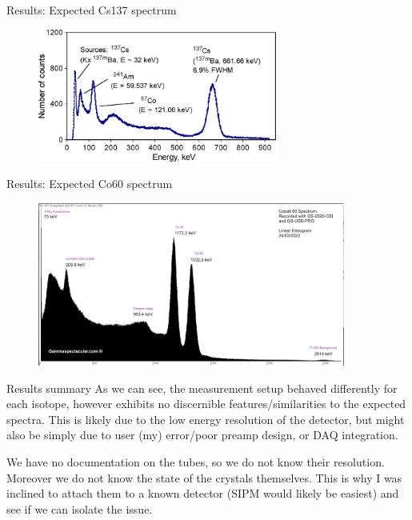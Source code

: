 \begin{frame}{Results: Expected Cs137 spectrum}
    \begin{figure}
        \centering
        \includegraphics[width=0.7\textwidth]{images/Cs137_expected_spectrum.jpg}
    \end{figure}
\end{frame}

\begin{frame}{Results: Expected Co60 spectrum}
    \begin{figure}
        \centering
        \includegraphics[width=0.9\textwidth]{images/Co60_expected_spectrum.png}
    \end{figure}
\end{frame}

\begin{frame}{Results summary}
    As we can see, the measurement setup behaved differently for each isotope, however exhibits no discernible features/similarities to the expected spectra. This is likely due to the low energy resolution of the detector, but might also be simply due to user (my) error/poor preamp design, or DAQ integration.

    We have no documentation on the tubes, so we do not know their resolution. Moreover we do not know the state of the crystals themselves. This is why I was inclined to attach them to a known detector (SIPM would likely be easiest) and see if we can isolate the issue.
\end{frame}

